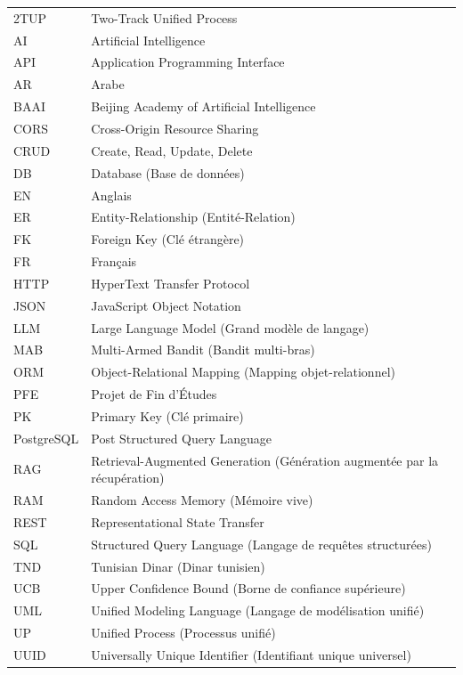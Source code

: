 \begin{longtable}{@{} p{3.2cm} p{11.5cm} @{}}
    2TUP        & Two-Track Unified Process \\[3pt]
    AI          & Artificial Intelligence \\[3pt]
    API         & Application Programming Interface \\[3pt]
    AR          & Arabe \\[3pt]
    BAAI        & Beijing Academy of Artificial Intelligence \\[3pt]
    CORS        & Cross-Origin Resource Sharing \\[3pt]
    CRUD        & Create, Read, Update, Delete \\[3pt]
    DB          & Database (Base de données) \\[3pt]
    EN          & Anglais \\[3pt]
    ER          & Entity-Relationship (Entité-Relation) \\[3pt]
    FK          & Foreign Key (Clé étrangère) \\[3pt]
    FR          & Français \\[3pt]
    HTTP        & HyperText Transfer Protocol \\[3pt]
    JSON        & JavaScript Object Notation \\[3pt]
    LLM         & Large Language Model (Grand modèle de langage) \\[3pt]
    MAB         & Multi-Armed Bandit (Bandit multi-bras) \\[3pt]
    ORM         & Object-Relational Mapping (Mapping objet-relationnel) \\[3pt]
    PFE         & Projet de Fin d'Études \\[3pt]
    PK          & Primary Key (Clé primaire) \\[3pt]
    PostgreSQL  & Post Structured Query Language \\[3pt]
    RAG         & Retrieval-Augmented Generation (Génération augmentée par la récupération) \\[3pt]
    RAM         & Random Access Memory (Mémoire vive) \\[3pt]
    REST        & Representational State Transfer \\[3pt]
    SQL         & Structured Query Language (Langage de requêtes structurées) \\[3pt]
    TND         & Tunisian Dinar (Dinar tunisien) \\[3pt]
    UCB         & Upper Confidence Bound (Borne de confiance supérieure) \\[3pt]
    UML         & Unified Modeling Language (Langage de modélisation unifié) \\[3pt]
    UP          & Unified Process (Processus unifié) \\[3pt]
    UUID        & Universally Unique Identifier (Identifiant unique universel) \\
\end{longtable}
